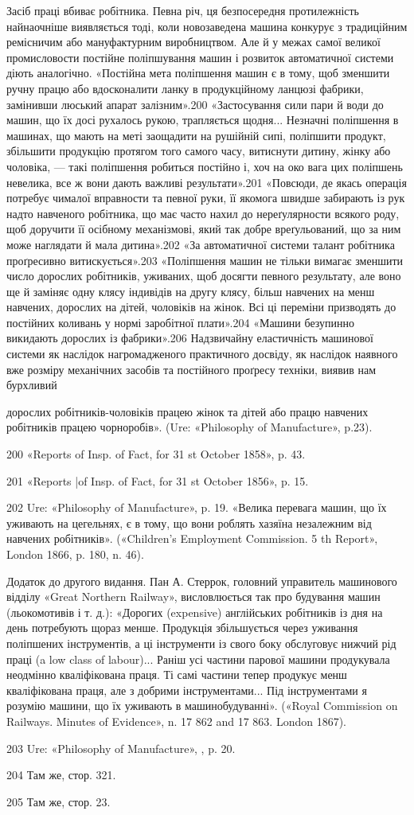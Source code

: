 Засіб праці вбиває робітника. Певна річ, ця безпосередня
протилежність найнаочніше виявляється тоді, коли новозаведена
машина конкурує з традиційним ремісничим або мануфактурним
виробництвом. Але й у межах самої великої промисловости постійне
поліпшування машин і розвиток автоматичної системи діють аналогічно.
«Постійна мета поліпшення машин є в тому, щоб зменшити
ручну працю або вдосконалити ланку в продукційному
ланцюзі фабрики, замінивши люський апарат залізним».200
«Застосування сили пари й води до машин, що їх досі рухалось
рукою, трапляється щодня... Незначні поліпшення в машинах,
що мають на меті заощадити на рушійній сипі, поліпшити продукт,
збільшити продукцію протягом того самого часу, витиснути дитину,
жінку або чоловіка, — такі поліпшення робиться постійно
і, хоч на око вага цих поліпшень невелика, все ж вони дають
важливі результати».201 «Повсюди, де якась операція потребує
чималої вправности та певної руки, її якомога швидше забирають
із рук надто навченого робітника, що має часто нахил до нереґулярности
всякого роду, щоб доручити її осібному механізмові,
який так добре вреґульований, що за ним може наглядати й
мала дитина».202 «За автоматичної системи талант робітника проґресивно
витискується».203 «Поліпшення машин не тільки вимагає
зменшити число дорослих робітників, уживаних, щоб досягти
певного результату, але воно ще й заміняє одну клясу індивідів
на другу клясу, більш навчених на менш навчених, дорослих
на дітей, чоловіків на жінок. Всі ці переміни призводять до постійних
коливань у нормі заробітної плати».204 «Машини безупинно
викидають дорослих із фабрики».206 Надзвичайну еластичність
машинової системи як наслідок нагромадженого практичного
досвіду, як наслідок наявного вже розміру механічних
засобів та постійного проґресу техніки, виявив нам бурхливий

дорослих робітників-чоловіків працею жінок та дітей або працю навчених
робітників працею чорноробів». (Ure: «Philosophy of Manufacture», p.23).

200 «Reports of Insp. of Fact, for 31 st October 1858», p. 43.

201 «Reports |of Insp. of Fact, for 31 st October 1856», p. 15.

202    Ure: «Philosophy of Manufacture», p. 19. «Велика перевага
машин, що їх уживають на цегельнях, є в тому, що вони роблять хазяїна
незалежним від навчених робітників». («Children’s Employment Commission.
5 th Report», London 1866, p. 180, n. 46).

Додаток до другого видання. Пан А. Стеррок, головний управитель
машинового відділу «Great Northern Railway», висловлюється так про
будування машин (льокомотивів і т. д.): «Дорогих (expensive) англійських
робітників із дня на день потребують щораз менше. Продукція збільшується
через уживання поліпшених інструментів, а ці інструменти із свого
боку обслуговує нижчий рід праці (a low class of labour)... Раніш усі частини
парової машини продукувала неодмінно кваліфікована праця.
Ті самі частини тепер продукує менш кваліфікована праця, але з добрими
інструментами... Під інструментами я розумію машини, що їх уживають
в машинобудуванні». («Royal Commission on Railways. Minutes of Evidence»,
n. 17 862 and 17 863. London 1867).

203 Ure: «Philosophy of Manufacture», , p. 20.

204 Там же, стор. 321.

205 Там же, стор. 23.
